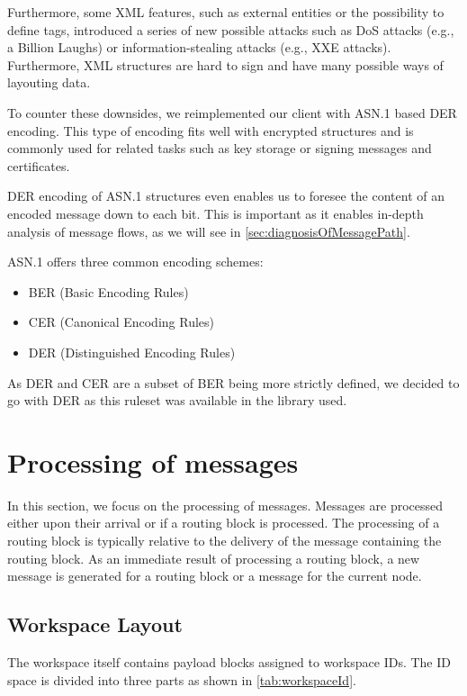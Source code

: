 Furthermore, some XML features, such as external entities or the possibility to define tags, introduced a series of new possible attacks such as DoS attacks (e.g., a Billion Laughs) or information-stealing attacks (e.g., XXE attacks). Furthermore, XML structures are hard to sign and have many possible ways of layouting data. 

To counter these downsides, we reimplemented our client with ASN.1 based DER encoding. This type of encoding fits well with encrypted structures and is commonly used for related tasks such as key storage or signing messages and certificates.

DER encoding of ASN.1 structures even enables us to foresee the content of an encoded message down to each bit. This is important as it enables in-depth analysis of message flows, as we will see in \cref{sec:diagnosisOfMessagePath}.

ASN.1 offers three common encoding schemes:
\begin{itemize}
	\item BER (Basic Encoding Rules)
	\item CER (Canonical Encoding Rules)
	\item DER (Distinguished Encoding Rules)
\end{itemize}

As DER and CER are a subset of BER being more strictly defined, we decided to go with DER as this ruleset was available in the library used.

\section{Processing of messages\label{sec:messageProcessing}}
In this section, we focus on the processing of messages. Messages are processed either upon their arrival or if a routing block is processed. The processing of a routing block is typically relative to the delivery of the message containing the routing block. As an immediate result of processing a routing block, a new message is generated for a routing block or a message for the current node.

\subsection{Workspace Layout}
The workspace itself contains payload blocks assigned to workspace IDs. The ID space is divided into three parts as shown in \cref{tab:workspaceId}.

